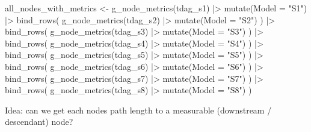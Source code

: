 \documentclass[
  letterpaper,
  DIV=11,
  numbers=noendperiod]{scrartcl}
\newenvironment{Shaded}{\begin{snugshade}}{\end{snugshade}}
\newcommand{\AttributeTok}[1]{\textcolor[rgb]{0.40,0.45,0.13}{#1}}
\newcommand{\FunctionTok}[1]{\textcolor[rgb]{0.28,0.35,0.67}{#1}}
\newcommand{\NormalTok}[1]{\textcolor[rgb]{0.00,0.23,0.31}{#1}}
\newcommand{\OtherTok}[1]{\textcolor[rgb]{0.00,0.23,0.31}{#1}}
\newcommand{\SpecialCharTok}[1]{\textcolor[rgb]{0.37,0.37,0.37}{#1}}
\newcommand{\StringTok}[1]{\textcolor[rgb]{0.13,0.47,0.30}{#1}}
\begin{document}
\begin{Shaded}
\begin{Highlighting}[]
\NormalTok{all\_nodes\_with\_metrics }\OtherTok{\textless{}{-}} \FunctionTok{g\_node\_metrics}\NormalTok{(tdag\_s1) }\SpecialCharTok{|\textgreater{}} 
    \FunctionTok{mutate}\NormalTok{(}\AttributeTok{Model =} \StringTok{"S1"}\NormalTok{) }\SpecialCharTok{|\textgreater{}} 
    \FunctionTok{bind\_rows}\NormalTok{(}
        \FunctionTok{g\_node\_metrics}\NormalTok{(tdag\_s2) }\SpecialCharTok{|\textgreater{}} 
            \FunctionTok{mutate}\NormalTok{(}\AttributeTok{Model =} \StringTok{"S2"}\NormalTok{)}
\NormalTok{    ) }\SpecialCharTok{|\textgreater{}} 
    \FunctionTok{bind\_rows}\NormalTok{(}
        \FunctionTok{g\_node\_metrics}\NormalTok{(tdag\_s3) }\SpecialCharTok{|\textgreater{}} 
            \FunctionTok{mutate}\NormalTok{(}\AttributeTok{Model =} \StringTok{"S3"}\NormalTok{)}
\NormalTok{    ) }\SpecialCharTok{|\textgreater{}} 
    \FunctionTok{bind\_rows}\NormalTok{(}
        \FunctionTok{g\_node\_metrics}\NormalTok{(tdag\_s4) }\SpecialCharTok{|\textgreater{}} 
            \FunctionTok{mutate}\NormalTok{(}\AttributeTok{Model =} \StringTok{"S4"}\NormalTok{)}
\NormalTok{    ) }\SpecialCharTok{|\textgreater{}} 
    \FunctionTok{bind\_rows}\NormalTok{(}
        \FunctionTok{g\_node\_metrics}\NormalTok{(tdag\_s5) }\SpecialCharTok{|\textgreater{}} 
            \FunctionTok{mutate}\NormalTok{(}\AttributeTok{Model =} \StringTok{"S5"}\NormalTok{)}
\NormalTok{    ) }\SpecialCharTok{|\textgreater{}} 
    \FunctionTok{bind\_rows}\NormalTok{(}
        \FunctionTok{g\_node\_metrics}\NormalTok{(tdag\_s6) }\SpecialCharTok{|\textgreater{}} 
            \FunctionTok{mutate}\NormalTok{(}\AttributeTok{Model =} \StringTok{"S6"}\NormalTok{)}
\NormalTok{    ) }\SpecialCharTok{|\textgreater{}} 
    \FunctionTok{bind\_rows}\NormalTok{(}
        \FunctionTok{g\_node\_metrics}\NormalTok{(tdag\_s7) }\SpecialCharTok{|\textgreater{}} 
            \FunctionTok{mutate}\NormalTok{(}\AttributeTok{Model =} \StringTok{"S7"}\NormalTok{)}
\NormalTok{    ) }\SpecialCharTok{|\textgreater{}} 
    \FunctionTok{bind\_rows}\NormalTok{(}
        \FunctionTok{g\_node\_metrics}\NormalTok{(tdag\_s8) }\SpecialCharTok{|\textgreater{}} 
            \FunctionTok{mutate}\NormalTok{(}\AttributeTok{Model =} \StringTok{"S8"}\NormalTok{)}
\NormalTok{    ) }
\end{Highlighting}
\end{Shaded}

Idea: can we get each nodes path length to a measurable (downstream /
descendant) node?
\end{document}
